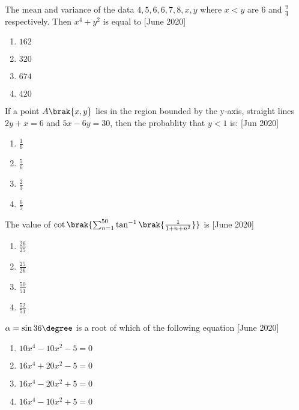 \iffalse
\title{2022}
\author{ai24btech11028 - Ronit Ranjan}
\section{mcq-single}
\fi 

    \item The mean and variance of the data $4, 5, 6, 6, 7, 8, x, y$ where $x < y$ are $6$ and $\frac{9}{4}$ respectively. Then $x^4 + y^2$ is equal to \hfill{[June 2020]}
    \begin{multicols}{2}
    \begin{enumerate}
        \item $162$
        \item $320$
        \item $674$
        \item $420$
    \end{enumerate}
    \end{multicols}

    \item If a point $A\brak{x, y}$ lies in the region bounded by the y-axis, straight lines $2y + x = 6$ and $5x - 6y = 30$, then the probablity that $y<1$ is: \hfill{[Jun 2020]}
    \begin{multicols}{2}
    \begin{enumerate}
        \item $\frac{1}{6}$
        \item $\frac{5}{6}$
        \item $\frac{2}{3}$
        \item $\frac{6}{7}$
    \end{enumerate}
    \end{multicols}    

    \item The value of $\cot \brak{ \sum_{n=1}^{50} \tan^{-1} \brak{ \frac{1}{1+n+n^2} }}$ is  \hfill{[June 2020]}
    \begin{multicols}{2}
    \begin{enumerate}
        \item $\frac{26}{25}$
        \item $\frac{25}{26}$
        \item $\frac{50}{51}$
        \item $\frac{52}{51}$
    \end{enumerate}
    \end{multicols}    

    \item $\alpha = \sin 36\degree$ is a root of which of the following equation \hfill{[June 2020]}
    \begin{multicols}{2}
    \begin{enumerate}
        \item $10x^4 - 10x^2 -5 = 0$
        \item $16x^4 + 20x^2 -5 = 0$
        \item $16x^4 - 20x^2 +5 = 0$
        \item $16x^4 - 10x^2 +5 = 0$
    \end{enumerate}
    \end{multicols}

